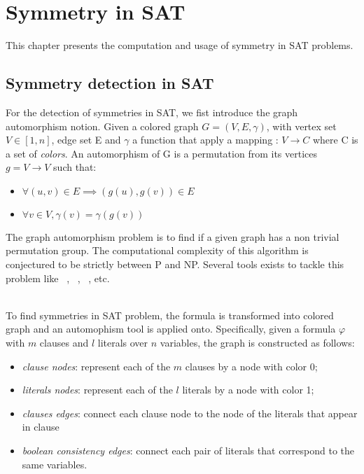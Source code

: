 \chapter{Symmetry in SAT}\label{chap:symmetryinsat}

This chapter presents the computation and usage of symmetry in SAT problems.

\section{Symmetry detection in SAT}

For the detection of symmetries in SAT, we fist introduce the graph automorphism notion.
Given a colored graph $G = (V, E, \gamma)$, with vertex set $V \in  [1, n] $, edge set E and
$\gamma$ a function that apply a mapping : $V \rightarrow C$ where C is a set of \emph{colors}.
An automorphism of G is a permutation from its vertices $g = V \rightarrow V$ 
such that:
\begin{itemize}
	\item $\forall (u, v) \in E \implies (g(u), g(v)) \in E$
	\item $\forall v \in V, \gamma(v) = \gamma(g(v))$
\end{itemize}

The graph automorphism problem is to find if a given graph has a non trivial permutation group. 
The computational complexity of this algorithm is conjectured to be strictly between P and NP.
Several tools exists to tackle this problem like \saucy~\cite{katebi2010symmetry},
\bliss~\cite{JunttilaKaski:ALENEX2007}, \nauty~\cite{mckay2003nauty}, etc.


\\
To find symmetries in SAT problem, the formula is transformed into colored graph
and an automophism tool is applied onto. Specifically, given a formula $\varphi$ with
$m$ clauses and $l$ literals over $n$ variables, the graph is constructed as follows:
\begin{itemize}
	\item \emph{clause nodes}: represent each of the $m$ clauses by a node with color 0;
	\item \emph{literals nodes}: represent each of the $l$ literals by a node with color 1;
	\item \emph{clauses edges}: connect each clause node to the node of the literals that appear in clause
	\item \emph{boolean consistency edges}: connect each pair of literals that correspond to the same variables.
\end{itemize}


